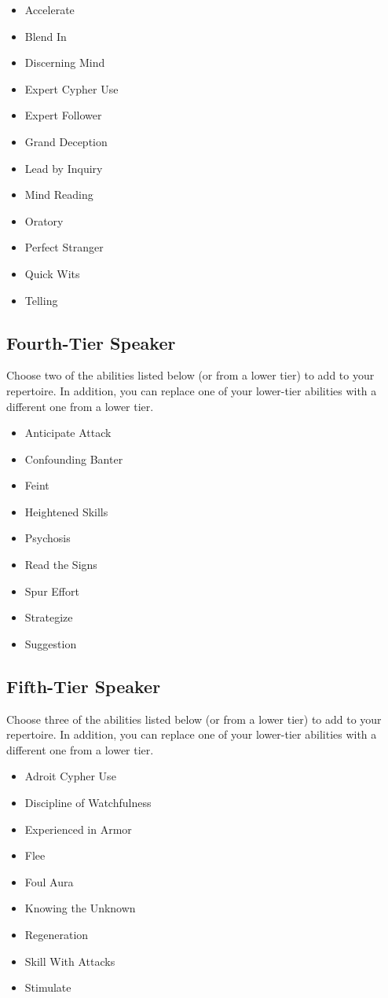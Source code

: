 \begin{itemize}
\item Accelerate
\item Blend In
\item Discerning Mind
\item Expert Cypher Use
\item Expert Follower
\item Grand Deception
\item Lead by Inquiry
\item Mind Reading
\item Oratory
\item Perfect Stranger
\item Quick Wits
\item Telling
\end{itemize} 

\subsection{Fourth-Tier Speaker}

Choose two of the abilities listed below (or from a lower tier) to add to your repertoire. In addition, you can replace one of your lower-tier abilities with a different one from a lower tier.

\begin{itemize}
\item Anticipate Attack
\item Confounding Banter
\item Feint
\item Heightened Skills
\item Psychosis
\item Read the Signs
\item Spur Effort
\item Strategize
\item Suggestion
\end{itemize}

\subsection{Fifth-Tier Speaker}

Choose three of the abilities listed below (or from a lower tier) to add to your repertoire. In addition, you can replace one of your lower-tier abilities with a different one from a lower tier.

\begin{itemize}
\item Adroit Cypher Use
\item Discipline of Watchfulness
\item Experienced in Armor
\item Flee
\item Foul Aura 
\item Knowing the Unknown
\item Regeneration
\item Skill With Attacks
\item Stimulate
\end{itemize}

